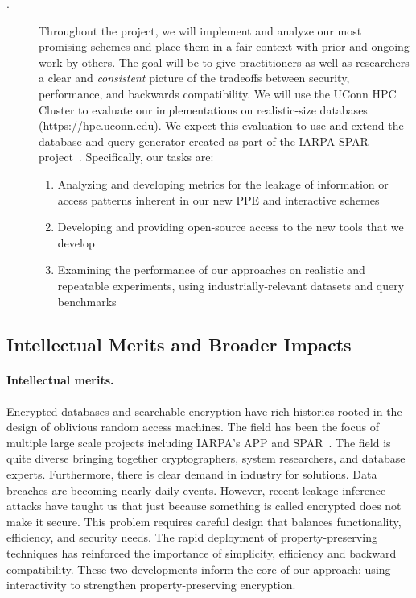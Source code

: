 \begin{description}
\item[.] Throughout the project, we will implement
and analyze our most promising schemes and place them in a fair context
with prior and ongoing work by others. The goal will be to give
practitioners as well as researchers a clear and \emph{consistent}
picture of the tradeoffs between security, performance, and backwards
compatibility.
We will use the UConn HPC Cluster to evaluate our
implementations on realistic-size databases (\url{https://hpc.uconn.edu}).
We expect this evaluation
to use and extend the database and query generator created as part of
the IARPA SPAR project~\cite{varia2015automated}. Specifically, our
tasks are:
\begin{enumerate}
\setlength\itemsep{0em}
\item Analyzing and developing metrics for the leakage of
information or access patterns inherent in our new PPE and interactive
schemes
\item Developing and providing open-source access to the new tools that
we develop
\item Examining the performance of our approaches on realistic and
repeatable experiments, using industrially-relevant datasets and query
benchmarks
\end{enumerate}
\end{description}

\subsection{Intellectual Merits and Broader Impacts}
\paragraph{Intellectual merits.}  
Encrypted databases and searchable encryption have rich histories rooted in the
design of oblivious random access machines.  The field has been the focus of multiple large scale projects including IARPA's APP and SPAR~\cite{spar_baa}.  The field is quite diverse bringing together cryptographers, system researchers, and database experts.  Furthermore, there is clear demand in industry for solutions.  Data breaches are becoming nearly daily events.  However, recent
leakage inference attacks have taught us that just because something is called encrypted does not make it secure.  This problem requires careful design that balances functionality, efficiency, and security needs.  The rapid deployment of property-preserving
techniques has reinforced the importance of simplicity, efficiency and backward
compatibility.  These two developments inform the core of our approach: using
interactivity to strengthen property-preserving encryption.

